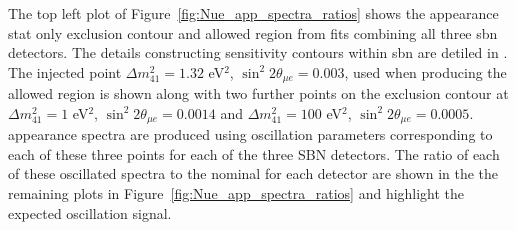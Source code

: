 \newpage
The top left plot of Figure~\ref{fig:Nue_app_spectra_ratios} shows the \nue appearance stat only exclusion contour and allowed region from fits combining all three \gls{sbn} detectors. The details constructing sensitivity contours within \gls{sbn} are detiled in . The injected point $\Delta m^2_{41} = 1.32$ eV$^2$, $\sin^2{2\theta_{\mu e}} = 0.003$, used when producing the allowed region is shown along with two further points on the exclusion contour at $\Delta m^2_{41} = 1$ eV$^2$, $\sin^2{2\theta_{\mu e}} = 0.0014$ and $\Delta m^2_{41} = 100$ eV$^2$, $\sin^2{2\theta_{\mu e}} = 0.0005$. \nue appearance spectra are produced using oscillation parameters corresponding to each of these three points for each of the three SBN detectors. The ratio of each of these oscillated spectra to the nominal for each detector are shown in the the remaining plots in Figure~\ref{fig:Nue_app_spectra_ratios} and highlight the expected oscillation signal.


